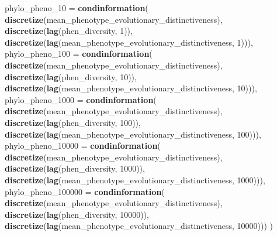 \documentclass[]{book}
\newenvironment{Shaded}{\begin{snugshade}}{\end{snugshade}}
\newcommand{\DataTypeTok}[1]{\textcolor[rgb]{0.13,0.29,0.53}{#1}}
\newcommand{\DecValTok}[1]{\textcolor[rgb]{0.00,0.00,0.81}{#1}}
\newcommand{\KeywordTok}[1]{\textcolor[rgb]{0.13,0.29,0.53}{\textbf{#1}}}
\newcommand{\NormalTok}[1]{#1}
\begin{document}
\begin{Shaded}
\begin{Highlighting}[]
{  \DataTypeTok{phylo_pheno_10 =}     \KeywordTok{condinformation}\NormalTok{(}
                          \KeywordTok{discretize}\NormalTok{(mean_phenotype_evolutionary_distinctiveness),}
                          \KeywordTok{discretize}\NormalTok{(}\KeywordTok{lag}\NormalTok{(phen_diversity, }\DecValTok{1}\NormalTok{)),}
                          \KeywordTok{discretize}\NormalTok{(}\KeywordTok{lag}\NormalTok{(mean_phenotype_evolutionary_distinctiveness, }\DecValTok{1}\NormalTok{))),}
  \DataTypeTok{phylo_pheno_100 =}    \KeywordTok{condinformation}\NormalTok{(}
                          \KeywordTok{discretize}\NormalTok{(mean_phenotype_evolutionary_distinctiveness),}
                          \KeywordTok{discretize}\NormalTok{(}\KeywordTok{lag}\NormalTok{(phen_diversity, }\DecValTok{10}\NormalTok{)),}
                          \KeywordTok{discretize}\NormalTok{(}\KeywordTok{lag}\NormalTok{(mean_phenotype_evolutionary_distinctiveness, }\DecValTok{10}\NormalTok{))),}
  \DataTypeTok{phylo_pheno_1000 =}   \KeywordTok{condinformation}\NormalTok{(}
                          \KeywordTok{discretize}\NormalTok{(mean_phenotype_evolutionary_distinctiveness),}
                          \KeywordTok{discretize}\NormalTok{(}\KeywordTok{lag}\NormalTok{(phen_diversity, }\DecValTok{100}\NormalTok{)),}
                          \KeywordTok{discretize}\NormalTok{(}\KeywordTok{lag}\NormalTok{(mean_phenotype_evolutionary_distinctiveness, }\DecValTok{100}\NormalTok{))),}
  \DataTypeTok{phylo_pheno_10000 =}  \KeywordTok{condinformation}\NormalTok{(}
                          \KeywordTok{discretize}\NormalTok{(mean_phenotype_evolutionary_distinctiveness),}
                          \KeywordTok{discretize}\NormalTok{(}\KeywordTok{lag}\NormalTok{(phen_diversity, }\DecValTok{1000}\NormalTok{)),}
                          \KeywordTok{discretize}\NormalTok{(}\KeywordTok{lag}\NormalTok{(mean_phenotype_evolutionary_distinctiveness, }\DecValTok{1000}\NormalTok{))),}
  \DataTypeTok{phylo_pheno_100000 =} \KeywordTok{condinformation}\NormalTok{(}
                          \KeywordTok{discretize}\NormalTok{(mean_phenotype_evolutionary_distinctiveness),}
                          \KeywordTok{discretize}\NormalTok{(}\KeywordTok{lag}\NormalTok{(phen_diversity, }\DecValTok{10000}\NormalTok{)),}
                          \KeywordTok{discretize}\NormalTok{(}\KeywordTok{lag}\NormalTok{(mean_phenotype_evolutionary_distinctiveness, }\DecValTok{10000}\NormalTok{)))}
\NormalTok{)}

}
\end{Highlighting}
\end{Shaded}
\end{document}
